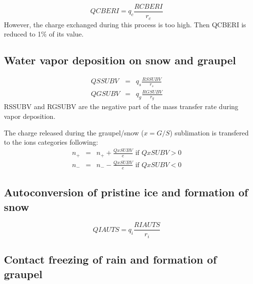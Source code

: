 \begin{equation}
  QCBERI = q_c \frac{RCBERI}{r_c}
\end{equation}
However, the charge exchanged during this process is too high.
Then QCBERI is reduced to 1\% of its value.

\subsection{Water vapor deposition on snow and graupel}

\begin{eqnarray}
  QSSUBV &=& q_s \frac{RSSUBV}{r_s} \\
  QGSUBV &=& q_g \frac{RGSUBV}{r_g}
\end{eqnarray}
RSSUBV and RGSUBV are the negative part of the mass transfer rate during vapor deposition.

The charge released during the graupel/snow ($x = G/S$) sublimation is transfered to the ions categories following:
\begin{eqnarray}
  n_+ &=& n_+ + \frac{QxSUBV}{e}  \mbox{ if } QxSUBV > 0 \\
  n_- &=& n_- - \frac{QxSUBV}{e}  \mbox{ if } QxSUBV < 0
\end{eqnarray}

\subsection{Autoconversion of pristine ice and formation of snow}

\begin{equation}
  QIAUTS = q_i \frac{RIAUTS}{r_i}
\end{equation}

\subsection{Contact freezing of rain and formation of graupel}


